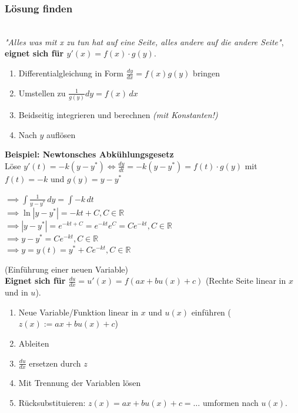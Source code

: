 \subsubsection{Lösung finden}

\\
\textit{"Alles was mit x zu tun hat auf eine Seite, alles andere auf die andere Seite"},
\textbf{eignet sich für $y'(x)=f(x)\cdot g(y)$}.

\begin{enumerate}
    \item Differentialgleichung in Form $\frac{dy}{dx}=f(x)g(y)$ bringen
    \item Umstellen zu $\frac{1}{g(y)}dy=f(x)\,dx$
    \item Beidseitig integrieren und berechnen \textit{(mit Konstanten!)}
    \item Nach $y$ auflösen
\end{enumerate}

\begin{exercise}
    \textbf{Beispiel: Newtonsches Abkühlungsgesetz}\\
    Löse $y'(t)=-k(y-y^*) \iff \frac{dy}{dt}=-k(y-y^*)=f(t) \cdot g(y)$ mit $f(t)=-k$ und $g(y)=y-y^*$

    $\implies \int \frac{1}{y-y^*}\,dy = \int -k\,dt$\\
    $\implies \ln|y-y^*|=-kt+C,C \in \mathbb{R}$\\
    $\implies |y-y^*|=e^{-kt+C}=e^{-kt}e^C=Ce^{-kt}, C \in \mathbb{R}$\\
    $\implies y-y^*=Ce^{-kt}, C \in \mathbb{R}$\\
    $\implies y = y(t) = y^* + Ce^{-kt}, C \in \mathbb{R}$

\end{exercise}

 (Einführung einer neuen Variable)\\
\textbf{Eignet sich für $\frac{du}{dx}=u'(x)=f(ax+bu(x)+c)$} (Rechte Seite linear in $x$ und in $u$).

\begin{enumerate}
    \item Neue Variable/Funktion linear in $x$ und $u(x)$ einführen ($z(x):=ax+bu(x)+c$)
    \item Ableiten
    \item $\frac{du}{dx}$ ersetzen durch $z$
    \item Mit Trennung der Variablen lösen
    \item Rücksubstituieren: $z(x)= ax+bu(x)+c = \dots$ umformen nach $u(x)$.
\end{enumerate}

